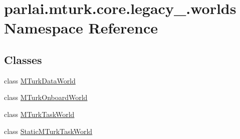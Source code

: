 \hypertarget{namespaceparlai_1_1mturk_1_1core_1_1legacy__2018_1_1worlds}{}\section{parlai.\+mturk.\+core.\+legacy\+\_.\+worlds Namespace Reference}
\label{namespaceparlai_1_1mturk_1_1core_1_1legacy__2018_1_1worlds}
\subsection*{Classes}
\begin{DoxyCompactItemize}
\item 
class \hyperlink{classparlai_1_1mturk_1_1core_1_1legacy__2018_1_1worlds_1_1MTurkDataWorld}{M\+Turk\+Data\+World}
\item 
class \hyperlink{classparlai_1_1mturk_1_1core_1_1legacy__2018_1_1worlds_1_1MTurkOnboardWorld}{M\+Turk\+Onboard\+World}
\item 
class \hyperlink{classparlai_1_1mturk_1_1core_1_1legacy__2018_1_1worlds_1_1MTurkTaskWorld}{M\+Turk\+Task\+World}
\item 
class \hyperlink{classparlai_1_1mturk_1_1core_1_1legacy__2018_1_1worlds_1_1StaticMTurkTaskWorld}{Static\+M\+Turk\+Task\+World}
\end{DoxyCompactItemize}
